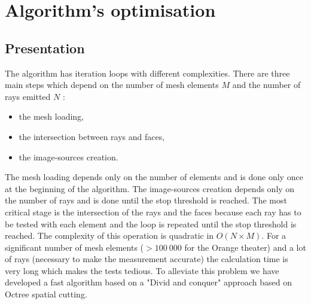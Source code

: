 \documentclass[AMA,STIX1COL]{WileyNJD-v2}
\begin{document}
\section{Algorithm's optimisation}\label{sec4}
\subsection{Presentation}

The algorithm has iteration loops with different complexities. There are three main steps which depend on the number of mesh elements $M$ and the number of rays emitted $N$ :\begin{itemize}
\item the mesh loading,
\item the intersection between rays and faces,
\item the image-sources creation.
\end{itemize}

The mesh loading depends only on the number of elements and is done only once at the beginning of the algorithm. The image-sources creation depends only on the number of rays and is done until the stop threshold is reached. The most critical stage is the intersection of the rays and the faces because each ray has to be tested with each element and the loop is repeated until the stop threshold is reached. The complexity of this operation is quadratic in $O(N\times M)$. For a significant number of mesh elements ($>100~000$ for the Orange theater) and a lot of rays (necessary to make the measurement accurate) the calculation time is very long which makes the tests tedious. To alleviate this problem we have developed a fast algorithm based on a "Divid and conquer" approach based on Octree spatial cutting.
\end{document}
